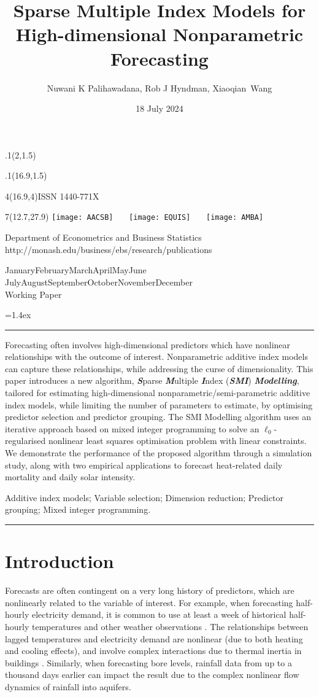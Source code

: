 \documentclass[
  11pt,
  a4paper,
]{article}
\title{Sparse Multiple Index Models for High-dimensional Nonparametric
Forecasting}
\date{18 July 2024}
\author{Nuwani K Palihawadana, Rob J Hyndman, Xiaoqian~Wang}
\makeatletter
\def\placefig#1#2#3#4{\begin{textblock}{.1}(#1,#2)\rlap{\texttt{[image: \#4]}}\end{textblock}}
\def\Date{\number\day}
\def\Month{\ifcase\month\or
 January\or February\or March\or April\or May\or June\or
 July\or August\or September\or October\or November\or December\fi}
\def\Year{\number\year}
\def\showjel{{\large\textsf{\textbf{JEL classification:}}~\@jel}}
\def\cover{{\sffamily\setcounter{page}{0}
        \thispagestyle{empty}
        \placefig{2}{1.5}{width=5cm}{monash2}
        \placefig{16.9}{1.5}{width=2.1cm}{MBSportrait}
        \begin{textblock}{4}(16.9,4)ISSN 1440-771X\end{textblock}
        \begin{textblock}{7}(12.7,27.9)\hfill
        \texttt{[image: AACSB]}~~~
        \texttt{[image: EQUIS]}~~~
        \texttt{[image: AMBA]}
        \end{textblock}
        \vspace*{2.5cm}
        \begin{center}\Large
        Department of Econometrics and Business Statistics\\[.5cm]
        \footnotesize http://monash.edu/business/ebs/research/publications
        \end{center}\vspace{2cm}
        \begin{center}
        \fbox{\parbox{14cm}{\begin{onehalfspace}\centering\Huge\vspace*{0.3cm}
                \textsf{\textbf{\expandafter{\@title}}}\vspace{1cm}\par
                \LARGE
                \expandafter{\@author}
                \end{onehalfspace}
        }}
        \end{center}
        \vfill
                \begin{center}\Large
                \Month~\Year\\[1cm]
                Working Paper \@wp
        \end{center}\vspace*{2cm}}}
\def\pageone{{\sffamily\setstretch{1}%
        \thispagestyle{empty}%
        \vbox to \textheight{%
        \raggedright\baselineskip=1.2cm
     {\fontsize{24.88}{30}\sffamily\textbf{\expandafter{\@title}}}
        \vspace{2cm}\par
        \hspace{1cm}\parbox{14cm}{\sffamily\large\@addresses}\vspace{1cm}\vfill
        \hspace{1cm}{\large\Date~\Month~\Year}\\[1cm]
        \hspace{1cm}\showjel\vss}}}
\def\blindtitle{{\sffamily
     \thispagestyle{plain}\raggedright\baselineskip=1.2cm
     {\fontsize{24.88}{30}\sffamily\textbf{\expandafter{\@title}}}\vspace{1cm}\par
        }}
\def\titlepage{{\cover\newpage\pageone\newpage\blindtitle}}
\let\maketitle\titlepage
\newenvironment{keywords}{\par\vspace{0.5cm}\noindent{\sffamily\textbf{Keywords:}}}{\vspace{0.25cm}\par\hrule\vspace{0.5cm}\par}
\renewenvironment{abstract}{\begin{minipage}{\textwidth}\parskip=1.4ex\noindent
\hrule\vspace{0.1cm}\par{\sffamily\textbf{\abstractname}}\newline\setstretch{1.5}}
  {\end{minipage}}
\makeatother
\begin{document}
\maketitle

\begin{abstract}
Forecasting often involves high-dimensional predictors which have
nonlinear relationships with the outcome of interest. Nonparametric
additive index models can capture these relationships, while addressing
the curse of dimensionality. This paper introduces a new algorithm,
\textbf{\emph{S}}parse \textbf{\emph{M}}ultiple \textbf{\emph{I}}ndex
(\textbf{\emph{SMI}}) \textbf{\emph{Modelling}}, tailored for estimating
high-dimensional nonparametric/semi-parametric additive index models,
while limiting the number of parameters to estimate, by optimising
predictor selection and predictor grouping. The SMI Modelling algorithm
uses an iterative approach based on mixed integer programming to solve
an \(\ell_{0}\)-regularised nonlinear least squares optimisation problem
with linear constraints. We demonstrate the performance of the proposed
algorithm through a simulation study, along with two empirical
applications to forecast heat-related daily mortality and daily solar
intensity.
\end{abstract}

\begin{keywords}
  Additive index models; Variable selection; Dimension
reduction; Predictor grouping; 
  Mixed integer programming.
\end{keywords}

\section{Introduction}\label{sec-introduction}

Forecasts are often contingent on a very long history of predictors,
which are nonlinearly related to the variable of interest. For example,
when forecasting half-hourly electricity demand, it is common to use at
least a week of historical half-hourly temperatures and other weather
observations \autocite{HF2010}. The relationships between lagged
temperatures and electricity demand are nonlinear (due to both heating
and cooling effects), and involve complex interactions due to thermal
inertia in buildings \autocite{FH2012}. Similarly, when forecasting bore
levels, rainfall data from up to a thousand days earlier can impact the
result \autocite{Peterson2014,Bakker2019,Rajaee2019} due to the complex
nonlinear flow dynamics of rainfall into aquifers.
\end{document}
